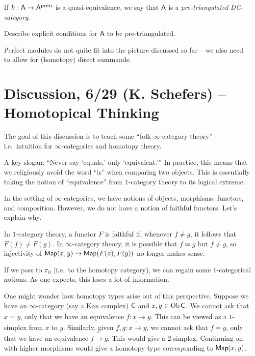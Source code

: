 \documentclass{amsart}
\begin{document}
\begin{dfn}
If $h: \mathsf{A} \to \mathsf{A}^{\mathrm{pretr}}$ is a quasi-equivalence, we say that $\mathsf{A}$ is a \emph{pre-triangulated DG-category}.
\end{dfn}

\begin{exer}
	Describe explicit conditions for $\mathsf{A}$ to be pre-triangulated.
\end{exer}

\begin{rmk}
	Perfect modules do not quite fit into the picture discussed so far -- we also need to allow for (homotopy) direct summands.
\end{rmk}

\section*{Discussion, 6/29 (K. Schefers) -- Homotopical Thinking}

The goal of this discussion is to teach some ``folk $\infty$-category theory'' -- i.e.\ intuition for $\infty$-categories and homotopy theory.

A key slogan: ``Never say `equals,' only `equivalent.'''
In practice, this means that we religiously avoid the word ``is'' when comparing two objects.
This is essentially taking the notion of ``equivalence'' from $1$-category theory to its logical extreme.

\begin{ex}
In the setting of $\infty$-categories, we have notions of objects, morphisms, functors, and composition.
However, we do not have a notion of faithful functors.
Let's explain why.

In $1$-category theory, a functor $F$ is faithful if, whenever $f \neq g$, it follows that $F(f) \neq F(g)$.
In $\infty$-category theory, it is possible that $f \simeq g$ but $f \neq g$, so injectivity of $\mathsf{Map}(x, y) \to \mathsf{Map}(F(x), F(y))$ no longer makes sense.
\end{ex}

If we pass to $\pi_0$ (i.e.\ to the homotopy category), we can regain some $1$-categorical notions.
As one expects, this loses a lot of information.

One might wonder how homotopy types arise out of this perspective.
Suppose we have an $\infty$-category (say a Kan complex) $\mathsf{C}$ and $x, y \in \operatorname{Ob} \mathsf{C}$.
We cannot ask that $x = y$, only that we have an equivalence $f: x \tilde{\rightarrow} y$.
This can be viewed as a $1$-simplex from $x$ to $y$.
Similarly, given $f, g: x \tilde{\rightarrow} y$, we cannot ask that $f = g$, only that we have an equivalence $f \tilde{\rightarrow} g$.
This would give a $2$-simplex.
Continuing on with higher morphisms would give a homotopy type corresponding to $\mathsf{Map}(x, y)$.
\end{document}
